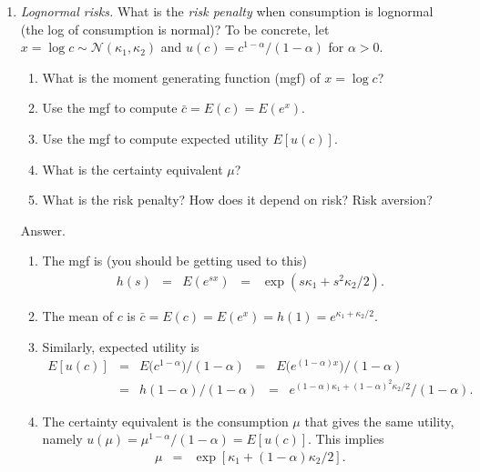 \documentclass[11pt]{article}
\newcommand{\cbar}{\bar{c}}
\begin{document}
\begin{enumerate}
\item {\it Lognormal risks.\/}
What is the {\it risk penalty\/} when consumption is lognormal
(the log of consumption is normal)?
To be concrete, let $x = \log c \sim \mathcal{N}(\kappa_1, \kappa_2)$
and $u(c) = c^{1-\alpha}/(1-\alpha)$ for $\alpha> 0$.

\begin{enumerate}
\item What is the moment generating function (mgf) of $x = \log c$?
\item Use the mgf to compute $\cbar = E(c) = E(e^x)$.
\item Use the mgf to compute expected utility $ E[u(c)]$.
\item What is the certainty equivalent $\mu$?
\item What is the risk penalty?  How does it depend on risk?  Risk aversion?
\end{enumerate}
%
Answer.
\begin{enumerate}
\item The mgf is (you should be getting used to this)
\begin{eqnarray*}
   h(s) &=&  E(e^{sx}) \;\;=\;\; \exp ( s \kappa_1 + s^2 \kappa_2/2 ).
\end{eqnarray*}

\item The mean of $c$ is
$ \bar{c} = E(c) = E(e^x) = h(1) = e^{\kappa_1+\kappa_2/2}$.

\item Similarly, expected utility is
\begin{eqnarray*}
        E[u(c)] &=& E \Big(c^{1-\alpha}\Big)/(1-\alpha) \;\;=\;\; E \Big(e^{(1-\alpha) x}\Big)/(1-\alpha) \\
        &=& h(1-\alpha)/(1-\alpha) \;\;=\;\; e^{(1-\alpha)\kappa_1+(1-\alpha)^2\kappa_2/2}/(1-\alpha).
\end{eqnarray*}

\item The certainty equivalent is the consumption $\mu$ that gives the same utility,
namely $  u(\mu) = \mu^{1-\alpha}/(1-\alpha) = E[u(c)] $.
This implies
\begin{eqnarray*}
    \mu &=& \exp[ \kappa_1 + (1-\alpha) \kappa_2 /2 ] .
\end{eqnarray*}


\end{enumerate}
\end{enumerate}
\end{document}
